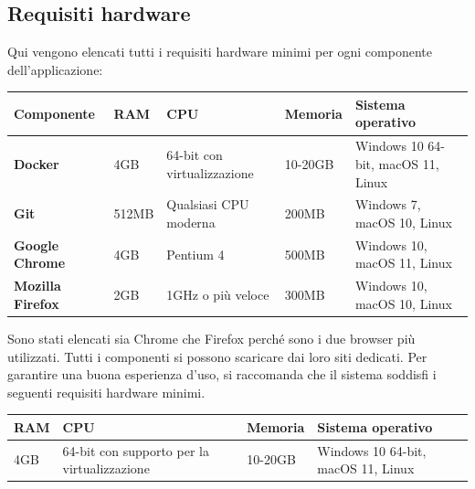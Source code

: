 \documentclass[a4paper,12pt]{article}
\begin{document}
    \subsection{Requisiti hardware}
        Qui vengono elencati tutti i requisiti hardware minimi per ogni componente dell'applicazione:
        \begin{center}
            \begin{tabularx}{\textwidth}{|l|l|l|l|X|}
                \hline
                \rowcolor{gold} 
                \textbf{Componente}  & \textbf{RAM}  & \textbf{CPU}     & \textbf{Memoria}    
                & \textbf{Sistema \newline operativo}   \\
                \hline
                \textbf{Docker} & {4GB} &  {64-bit con virtualizzazione} & 10-20GB & {Windows 10 64-bit, macOS 11, Linux} \\
                \hline
                \textbf{Git} & {512MB} & {Qualsiasi CPU moderna} & {200MB} & {Windows 7, macOS 10, Linux} \\
                \hline
                \textbf{Google Chrome} & {4GB} & {Pentium 4} & {500MB} & {Windows 10, \newline macOS 11, Linux} \\
                \hline
                \textbf{Mozilla Firefox} & {2GB} & {1GHz o più veloce} & {300MB} & {Windows 10, \newline macOS 10, Linux}\\
                \hline
                 \end{tabularx}
                 \end{center}
                 Sono stati elencati sia Chrome che Firefox perché sono i due browser più utilizzati. 
                 Tutti i componenti si possono scaricare dai loro siti dedicati. \newline
                 Per garantire una buona esperienza d’uso, si raccomanda che il sistema soddisfi i seguenti requisiti  hardware minimi.
        \begin{center}
            \begin{tabularx}{\textwidth}{|l|l|l|X|}
                \hline
                \rowcolor{gold} 
                \textbf{RAM}  & \textbf{CPU}  & \textbf{Memoria}  & \textbf{Sistema operativo}   \\
                \hline
                {4GB} & {64-bit con supporto per la virtualizzazione} & {10-20GB} & {Windows 10 64-bit,  \newline macOS 11, Linux} \\
                \hline
        \end{tabularx}
        \end{center}
                 
\end{document}
